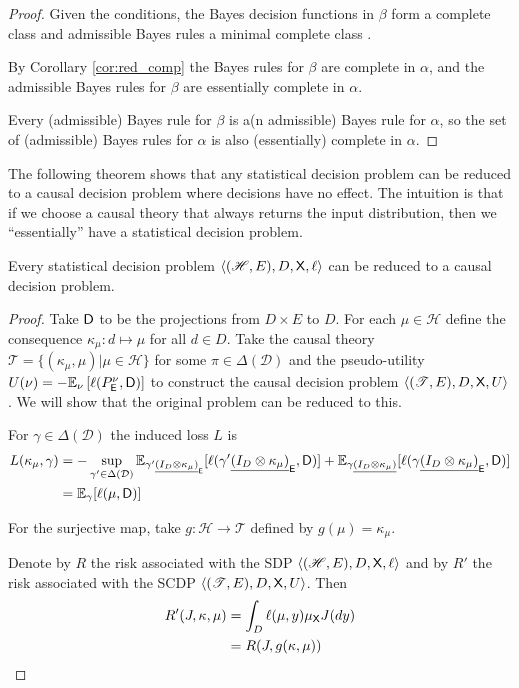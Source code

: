 \begin{proof}
Given the conditions, the Bayes decision functions in $\beta$ form a complete class and admissible Bayes rules a minimal complete class \cite{toutenburg_ferguson_1970}.

By Corollary \ref{cor:red_comp} the Bayes rules for $\beta$ are complete in $\alpha$, and the admissible Bayes rules for $\beta$ are essentially complete in $\alpha$.

Every (admissible) Bayes rule for $\beta$ is a(n admissible) Bayes rule for $\alpha$, so the set of (admissible) Bayes rules for $\alpha$ is also (essentially) complete in $\alpha$.
\end{proof}

The following theorem shows that any statistical decision problem can be reduced to a causal decision problem where decisions have no effect. The intuition is that if we choose a causal theory that always returns the input distribution, then we ``essentially'' have a statistical decision problem.

\begin{theorem}\label{th:sdp_to_cdp}
Every statistical decision problem $\langle (\mathscr{H},E),D,\mathsf{X},\ell\rangle$ can be reduced to a causal decision problem.
\end{theorem}
\begin{proof}
Take $\mathsf{D}$ to be the projections from $D\times E$ to $D$. For each $\mu\in \mathscr{H}$ define the consequence $\kappa_\mu:d\mapsto \mu$ for all $d\in D$. Take the causal theory $\mathscr{T}=\{(\kappa_\mu,\mu)|\mu\in \mathscr{H}\}$ for some $\pi\in \Delta(\mathcal{D})$ and the pseudo-utility $U(\nu) = -\mathbb{E}_\nu \left[\ell(P^\nu_{\mathsf{E}},\mathsf{D})\right]$ to construct the causal decision problem $\langle (\mathscr{T},E),D,\mathsf{X},U\rangle$. We will show that the original problem can be reduced to this.

For $\gamma\in \Delta(\mathcal{D})$ the induced loss $L$ is
\begin{align}
    L(\kappa_\mu,\gamma) &= -\sup_{\gamma'\in \Delta(\mathcal{D})} \mathbb{E}_{\gamma' \underline{(I_D\otimes \kappa_\mu)}_{\mathsf{E}}}[\ell(\gamma'\underline{(I_D\otimes \kappa_\mu)}_{\mathsf{E}},\mathsf{D})] + \mathbb{E}_{\gamma \underline{(I_D\otimes \kappa_\mu)}}[\ell(\gamma \underline{(I_D\otimes \kappa_\mu)}_{\mathsf{E}},\mathsf{D})]\\
                     &= \mathbb{E}_{\gamma}[\ell(\mu,\mathsf{D})]
\end{align}

For the surjective map, take $g:\mathscr{H}\to \mathscr{T}$ defined by $g(\mu)=\kappa_\mu$.

Denote by $R$ the risk associated with the SDP $\langle (\mathscr{H},E),D,\mathsf{X},\ell\rangle$ and by $R'$ the risk associated with the SCDP $\langle (\mathscr{T},E),D,\mathsf{X},U\rangle$. Then
\begin{align}
    R'(J,\kappa,\mu) &= \int_D \ell(\mu, y) \mu_{\mathsf{X}} J(dy)\\
                   &=R(J,g(\kappa,\mu))
\end{align}
\end{proof}

